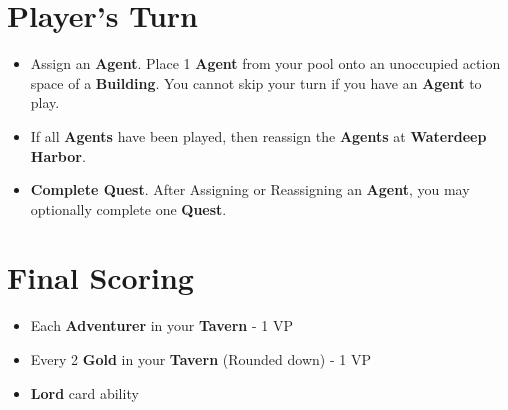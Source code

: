 \documentclass[12pt]{article}
\newenvironment{itemizeCustom}
{\begin{itemize}
  \setlength{\itemsep}{1pt}
  \setlength{\parskip}{0pt}
  \setlength{\parsep}{0pt}}
{\end{itemize}}
\begin{document}
\begin{mdframed}[style = customFrame]
\begin{multicols*}{2}
\section*{Player's Turn}
\begin{itemizeCustom}
	\item Assign an \textbf{Agent}. Place 1 \textbf{Agent} from your pool onto an unoccupied action space of a \textbf{Building}. You cannot skip your turn if you have an \textbf{Agent} to play.
	\item If all \textbf{Agents} have been played, then reassign the \textbf{Agents} at \textbf{Waterdeep Harbor}.
	\item \textbf{Complete Quest}. After Assigning or Reassigning an \textbf{Agent}, you may optionally complete one \textbf{Quest}.
\end{itemizeCustom}

\section*{Final Scoring}
\begin{itemizeCustom}
	\item Each \textbf{Adventurer} in your \textbf{Tavern} - 1 VP
	\item Every 2 \textbf{Gold} in your \textbf{Tavern} (Rounded down) - 1 VP
	\item \textbf{Lord} card ability
\end{itemizeCustom}

\end{multicols*}
\end{mdframed}
\end{document}
